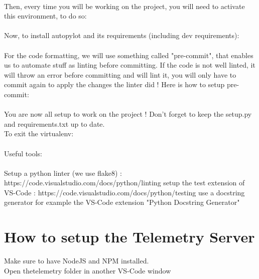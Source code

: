 \documentclass[12pt]{article}
\begin{document}
\noindent{}\\

Then, every time you will be working on the project, you will need to activate this environment, to do so:\\

\noindent{}\\

Now, to install autopylot and its requirements (including dev requirements):\\

\noindent{}\\

For the code formatting, we will use something called "pre-commit", that enables us to automate stuff as linting before committing. If the code is not well linted, it will throw an error before committing and will lint it, you will only have to commit again to apply the changes the linter did ! Here is how to setup pre-commit:\\


\noindent{}\\

You are now all setup to work on the project ! Don't forget to keep the setup.py and requirements.txt up to date.\\

To exit the virtualenv:\\

\noindent{}\\

Useful tools:
\\\\
Setup a python linter (we use flake8) : https://code.visualstudio.com/docs/python/linting
setup the test extension of VS-Code : https://code.visualstudio.com/docs/python/testing
use a docstring generator for example the VS-Code extension "Python Docstring Generator"


\section{How to setup the Telemetry Server}
Make sure to have NodeJS and NPM installed.\\
Open thetelemetry folder in another VS-Code window\\
\end{document}
